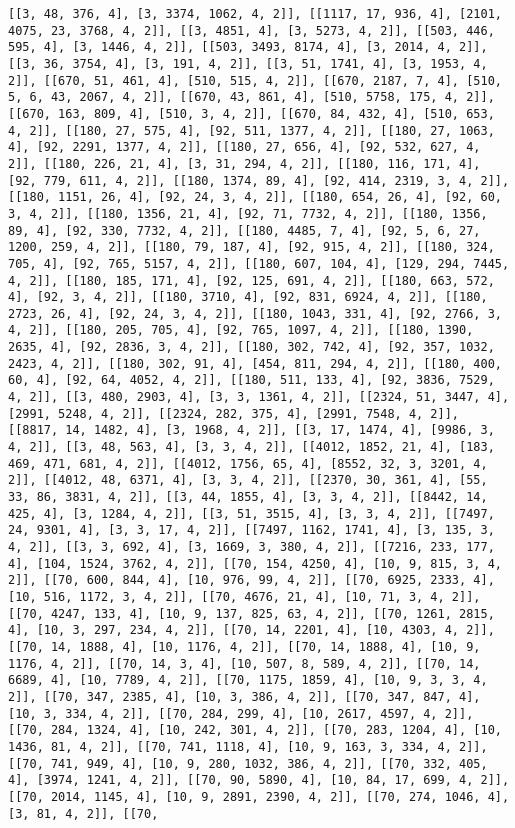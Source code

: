 \documentclass[12pt,fleqn]{article}\usepackage{../../common}
\begin{document}
\begin{verbatim}
[[3, 48, 376, 4], [3, 3374, 1062, 4, 2]], [[1117, 17, 936, 4], [2101, 4075, 23, 3768, 4, 2]], [[3, 4851, 4], [3, 5273, 4, 2]], [[503, 446, 595, 4], [3, 1446, 4, 2]], [[503, 3493, 8174, 4], [3, 2014, 4, 2]], [[3, 36, 3754, 4], [3, 191, 4, 2]], [[3, 51, 1741, 4], [3, 1953, 4, 2]], [[670, 51, 461, 4], [510, 515, 4, 2]], [[670, 2187, 7, 4], [510, 5, 6, 43, 2067, 4, 2]], [[670, 43, 861, 4], [510, 5758, 175, 4, 2]], [[670, 163, 809, 4], [510, 3, 4, 2]], [[670, 84, 432, 4], [510, 653, 4, 2]], [[180, 27, 575, 4], [92, 511, 1377, 4, 2]], [[180, 27, 1063, 4], [92, 2291, 1377, 4, 2]], [[180, 27, 656, 4], [92, 532, 627, 4, 2]], [[180, 226, 21, 4], [3, 31, 294, 4, 2]], [[180, 116, 171, 4], [92, 779, 611, 4, 2]], [[180, 1374, 89, 4], [92, 414, 2319, 3, 4, 2]], [[180, 1151, 26, 4], [92, 24, 3, 4, 2]], [[180, 654, 26, 4], [92, 60, 3, 4, 2]], [[180, 1356, 21, 4], [92, 71, 7732, 4, 2]], [[180, 1356, 89, 4], [92, 330, 7732, 4, 2]], [[180, 4485, 7, 4], [92, 5, 6, 27, 1200, 259, 4, 2]], [[180, 79, 187, 4], [92, 915, 4, 2]], [[180, 324, 705, 4], [92, 765, 5157, 4, 2]], [[180, 607, 104, 4], [129, 294, 7445, 4, 2]], [[180, 185, 171, 4], [92, 125, 691, 4, 2]], [[180, 663, 572, 4], [92, 3, 4, 2]], [[180, 3710, 4], [92, 831, 6924, 4, 2]], [[180, 2723, 26, 4], [92, 24, 3, 4, 2]], [[180, 1043, 331, 4], [92, 2766, 3, 4, 2]], [[180, 205, 705, 4], [92, 765, 1097, 4, 2]], [[180, 1390, 2635, 4], [92, 2836, 3, 4, 2]], [[180, 302, 742, 4], [92, 357, 1032, 2423, 4, 2]], [[180, 302, 91, 4], [454, 811, 294, 4, 2]], [[180, 400, 60, 4], [92, 64, 4052, 4, 2]], [[180, 511, 133, 4], [92, 3836, 7529, 4, 2]], [[3, 480, 2903, 4], [3, 3, 1361, 4, 2]], [[2324, 51, 3447, 4], [2991, 5248, 4, 2]], [[2324, 282, 375, 4], [2991, 7548, 4, 2]], [[8817, 14, 1482, 4], [3, 1968, 4, 2]], [[3, 17, 1474, 4], [9986, 3, 4, 2]], [[3, 48, 563, 4], [3, 3, 4, 2]], [[4012, 1852, 21, 4], [183, 469, 471, 681, 4, 2]], [[4012, 1756, 65, 4], [8552, 32, 3, 3201, 4, 2]], [[4012, 48, 6371, 4], [3, 3, 4, 2]], [[2370, 30, 361, 4], [55, 33, 86, 3831, 4, 2]], [[3, 44, 1855, 4], [3, 3, 4, 2]], [[8442, 14, 425, 4], [3, 1284, 4, 2]], [[3, 51, 3515, 4], [3, 3, 4, 2]], [[7497, 24, 9301, 4], [3, 3, 17, 4, 2]], [[7497, 1162, 1741, 4], [3, 135, 3, 4, 2]], [[3, 3, 692, 4], [3, 1669, 3, 380, 4, 2]], [[7216, 233, 177, 4], [104, 1524, 3762, 4, 2]], [[70, 154, 4250, 4], [10, 9, 815, 3, 4, 2]], [[70, 600, 844, 4], [10, 976, 99, 4, 2]], [[70, 6925, 2333, 4], [10, 516, 1172, 3, 4, 2]], [[70, 4676, 21, 4], [10, 71, 3, 4, 2]], [[70, 4247, 133, 4], [10, 9, 137, 825, 63, 4, 2]], [[70, 1261, 2815, 4], [10, 3, 297, 234, 4, 2]], [[70, 14, 2201, 4], [10, 4303, 4, 2]], [[70, 14, 1888, 4], [10, 1176, 4, 2]], [[70, 14, 1888, 4], [10, 9, 1176, 4, 2]], [[70, 14, 3, 4], [10, 507, 8, 589, 4, 2]], [[70, 14, 6689, 4], [10, 7789, 4, 2]], [[70, 1175, 1859, 4], [10, 9, 3, 3, 4, 2]], [[70, 347, 2385, 4], [10, 3, 386, 4, 2]], [[70, 347, 847, 4], [10, 3, 334, 4, 2]], [[70, 284, 299, 4], [10, 2617, 4597, 4, 2]], [[70, 284, 1324, 4], [10, 242, 301, 4, 2]], [[70, 283, 1204, 4], [10, 1436, 81, 4, 2]], [[70, 741, 1118, 4], [10, 9, 163, 3, 334, 4, 2]], [[70, 741, 949, 4], [10, 9, 280, 1032, 386, 4, 2]], [[70, 332, 405, 4], [3974, 1241, 4, 2]], [[70, 90, 5890, 4], [10, 84, 17, 699, 4, 2]], [[70, 2014, 1145, 4], [10, 9, 2891, 2390, 4, 2]], [[70, 274, 1046, 4], [3, 81, 4, 2]], [[70, 
\end{verbatim}
\end{document}
